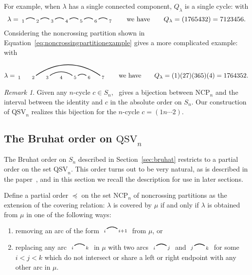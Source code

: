 \documentclass[12pt]{amsart}
\theoremstyle{definition}
\theoremstyle{remark}
\newtheorem{rem}[equation]{Remark}
\numberwithin{equation}{section}
\newcommand{\QSV}{\mathrm{QSV}}
\newcommand{\NCP}{\mathrm{NCP}}
\newcommand{\edge}[2]{\tikz[scale = 0.75, baseline = -0.2cm]{
\draw (0.1, 0) node[inner sep = 0ex] (a) {};
\node[left, xshift = 0.1cm, yshift = -0.1cm] at (a) {$\scriptstyle #1$};
\draw (0.9, 0)  node[inner sep = 0ex] (b) {};
\node[right, xshift = -0.1cm, yshift = -0.1cm] at (b) {$\scriptstyle #2$};
\draw[thick] (a) to[out = 35, in = 145] (b);}}
\begin{document}
For example, when $\lambda$ has a single connected component, $Q_{\lambda}$ is a single cycle: with
\[
\lambda = \begin{tikzpicture}[scale = 0.75, baseline = 0.75*-0.2]
\foreach \x in {1, ..., 7}{\draw[fill] (\x - 1, 0) node[inner sep = 2pt] (\x) {$\scriptstyle \x$};}
\foreach \i\j in {1/2, 2/3, 3/4, 4/5, 5/6, 6/7}{\draw[thick] (\i) to[out = 35, in = 145] (\j);}
\end{tikzpicture}
\qquad\text{we have}\qquad
Q_{\lambda} = (1765432) = 7123456.
\]
Considering the noncrossing partition shown in Equation~\eqref{eq:noncrossingpartitionexample} gives a more complicated example: with
\[
\lambda = \begin{tikzpicture}[scale = 0.75, baseline = 0.75*-0.2]
\foreach \x in {1, ..., 7}{\draw[fill] (\x - 1, 0) node[inner sep = 2pt] (\x) {$\scriptstyle \x$};}
\foreach \i\j in {5/6, 3/5,2/7}{\draw[thick] (\i) to[out = 35, in = 145] (\j);}
\end{tikzpicture}
\qquad\text{we have}\qquad
Q_{\lambda} = (1)(27)(365)(4) = 1764352.
\]

\begin{rem}
\label{rem:QSVnoncrossing}
Given any $n$-cycle $c \in S_{n}$,~\cite{Baine} gives a bijection between $\NCP_{n}$ and the interval between the identity and $c$ in the absolute order on $S_{n}$.  Our construction of $\QSV_{n}$ realizes this bijection for the $n$-cycle $c = (1n\cdots 2)$.  
\end{rem}

\subsection{The Bruhat order on $\QSV_{n}$}
\label{sec:bruhatballot}

The Bruhat order on $S_{n}$ described in Section~\ref{sec:bruhat} restricts to a partial order on the set $\QSV_{n}$.
This order turns out to be very natural, as is described in the paper~\cite{GobetWilliams}, and in this section we recall the description for use in later sections.

Define a partial order $\preceq$ on the set $\NCP_{n}$ of noncrossing partitions as the extension of the covering relation: $\lambda$ is covered by $\mu$ if and only if $\lambda$ is obtained from $\mu$ in one of the following ways:
\begin{enumerate}
\item removing an arc of the form $ \edge{i}{i+1}$ from $\mu$, or

\item replacing any arc $ \edge{i}{k}$ in $\mu$ with two arcs $ \edge{i}{j}$ and $ \edge{j}{k}$ for some $i < j < k$ which do not intersect or share a left or right endpoint with any other arc in $\mu$.

\end{enumerate}
\end{document}
